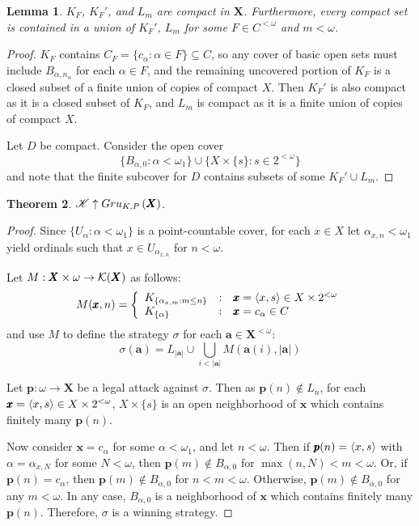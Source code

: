 \documentclass{amsart}
\newtheorem{theorem}{Theorem}[section]
\newtheorem{lemma}[theorem]{Lemma}
\theoremstyle{definition}
\begin{document}
\begin{lemma}
  $K_F$, $K_F'$, and $L_m$ are compact in $\pmb X$.
  Furthermore, every compact set is contained in a union of $K_F'$, $L_m$
  for some $F\in C^{<\omega}$ and $m<\omega$.
\end{lemma}

\begin{proof}
  $K_F$ contains $C_F=\{c_\alpha: \alpha\in F\}\subseteq C$, so any
  cover of basic open sets must include $B_{\alpha,n_\alpha}$ for each
  $\alpha\in F$, and the remaining uncovered portion of $K_F$ is a closed
  subset of a finite union of copies of compact $X$. Then $K_F'$ is also
  compact as it is a closed subset of $K_F$, and $L_m$ is compact as it
  is a finite union of copies of compact $X$.

  Let $D$ be compact. Consider the open cover
    \[
      \{
        B_{\alpha,0}
      :
        \alpha<\omega_1
      \}
      \cup
      \{
        X\times\{s\}
      :
        s\in 2^{<\omega}
      \}
    \]
  and note that the finite subcover for $D$ contains subsets of some
  $K_F' \cup L_m$.
\end{proof}

\begin{theorem}
  $\mathscr{K}\uparrow Gru_{K,P}\left({\pmb X}\right)$.
\end{theorem}

\begin{proof}
  Since $\{U_\alpha:\alpha<\omega_1\}$ is a point-countable cover,
  for each $x\in X$ let $\alpha_{x,n}<\omega_1$ yield
  ordinals such that $x\in U_{\alpha_{x,n}}$ for $n<\omega$.

  Let $M:\pmb X\times \omega\to \mathcal{K}(\pmb X)$ as follows:
    \[
      M(\pmb x,n)
        =
      \left\{
        \begin{array}{lcl}
          K_{\{\alpha_{x,m}:m\leq n\}}
        & : &
          \pmb x = \langle x,s\rangle \in X\times 2^{<\omega}
        \\
          K_{\{\alpha\}}
        & : &
          \pmb x = c_\alpha \in C
        \end{array}
      \right.
    \]
  and use $M$ to define the strategy $\sigma$ for each
  $\pmb a\in\pmb X^{<\omega}$:
    \[
      \sigma(\pmb a)
        =
      L_{|\pmb a|}
        \cup
      \bigcup_{i< |\pmb a|}
      M(\pmb a(i),|\pmb a|)
    \]

  Let $\pmb p:\omega\to\pmb X$ be a legal attack against $\sigma$. Then as
  $\pmb p(n)\not\in L_n$, for each $\pmb x=\langle x,s\rangle\in X\times 2^{<\omega}$,
  $X\times\{s\}$ is an open neighborhood of $\pmb x$ which contains finitely
  many $\pmb p(n)$.

  Now consider $\pmb x=c_\alpha$ for some $\alpha<\omega_1$, and let $n<\omega$.
  Then if $\pmb p(n)=\langle x,s\rangle$ with $\alpha = \alpha_{x,N}$ for some $N<\omega$,
  then $\pmb p(m)\not\in B_{\alpha,0}$ for $\max(n,N)<m<\omega$.
  Or, if $\pmb p(n)=c_\alpha$, then
  $\pmb p(m)\not\in B_{\alpha,0}$ for $n<m<\omega$.
  Otherwise, $\pmb p(m)\not\in B_{\alpha,0}$ for any $m<\omega$.
  In any case, $B_{\alpha,0}$ is a neighborhood of $\pmb x$ which
  contains finitely
  many $\pmb p(n)$. Therefore, $\sigma$ is a winning strategy.
\end{proof}
\end{document}
